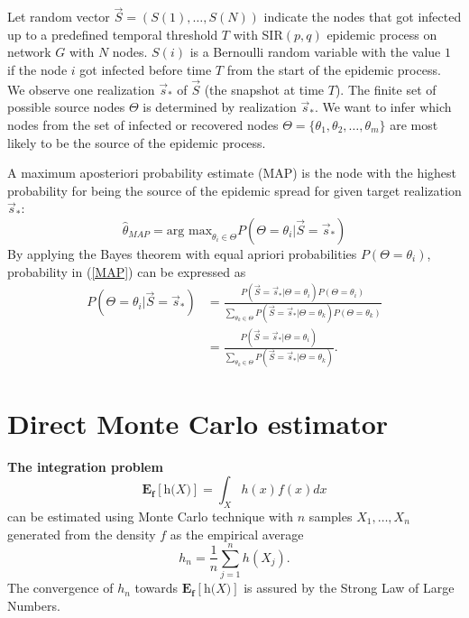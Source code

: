 \documentclass[times, utf8, diplomski]{fer}
\begin{document}
Let random vector $\vec S = (S(1), \ldots, S(N))$ indicate the nodes that got infected up to a predefined temporal threshold $T$ with SIR$(p, q)$ epidemic process on network $G$ with $N$ nodes. $S(i)$ is a Bernoulli random variable with the value $1$ if the node $i$ got infected before time $T$ from the start of the epidemic process. We observe one realization $\vec s_*$ of $\vec S$ (the snapshot at time $T$). The finite set of possible source nodes $\Theta$ is determined by realization $\vec s_*$. We want to infer which nodes from the set of infected or recovered nodes $\Theta = \{\theta_1, \theta_2, \ldots, \theta_m \}$ are most likely to be the source of the epidemic process.  

A maximum aposteriori probability estimate (MAP) is the node with the highest probability for being the source of the epidemic spread for  given target realization $\vec s_*$: 
\begin{equation}
\hat{\theta}_{MAP} = \text{arg max}_{\theta_i \in \Theta} P(\Theta = \theta_i | \vec{S} = \vec s_*)
\label{MAP}
\end{equation}
By applying the Bayes theorem with equal apriori probabilities $P(\Theta = \theta_i)$, probability in (\ref{MAP}) can be expressed as 
\begin{equation}
\begin{aligned}
P(\Theta = \theta_i | \vec{S} = \vec s_*) &= \frac{P(\vec S = \vec s_* | \Theta = \theta_i) P(\Theta = \theta_i)}{\sum_{\theta_k \in \Theta} P(\vec S = \vec s_* | \Theta = \theta_k) P(\Theta = \theta_k)} \\ &= \frac{P(\vec S = \vec s_* | \Theta = \theta_i)}{\sum_{\theta_k \in \Theta} P(\vec S = \vec s_* | \Theta = \theta_k)}.
\end{aligned}
\label{MAP_pravi}
\end{equation}

\section{Direct Monte Carlo estimator}

\textbf{The integration problem}
\begin{equation}
\mathbf{E_f[\textit{h(X)}]} = \int_{X} h(x) f(x) dx
\label{exp}
\end{equation} can be estimated using Monte Carlo technique with $n$ samples $X_1, \ldots, X_n$ generated from the density $f$ as the empirical average 
\begin{equation}
h_n = \frac{1}{n} \sum_{j = 1}^{n} h(X_j).
\end{equation}
The convergence of $h_n$ towards $\mathbf{E_f[\textit{h(X)}]}$ is assured by the Strong Law of Large Numbers.
\end{document}
